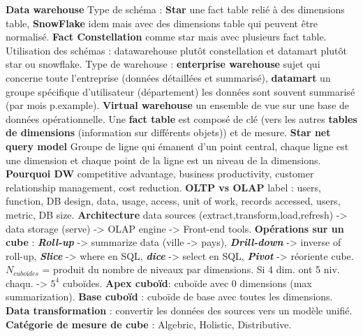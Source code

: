 \documentclass[9pt,a4paper]{report}
\begin{document}
\textbf{Data warehouse} Type de schéma : \textbf{Star} une fact table relié à des dimensions table, \textbf{SnowFlake} idem mais avec des dimensions table qui peuvent être normalisé. \textbf{ Fact Constellation} comme star mais avec plusieurs fact table. Utilisation des schémas : datawarehouse plutôt constellation et datamart plutôt star ou snowflake. Type de warehouse : \textbf{enterprise warehouse} sujet qui concerne toute l'entreprise (données détaillées et summarisé), \textbf{datamart} un groupe spécifique d'utilisateur (département) les données sont souvent summarisé (par mois p.example). \textbf{Virtual warehouse} un ensemble de vue sur une base de données opérationnelle. Une \textbf{fact table} est composé de clé (vers les autres \textbf{tables de dimensions} (information sur différents objets)) et de mesure. \textbf{Star net query model} Groupe de ligne qui émanent d'un point central, chaque ligne est une dimension et chaque point de la ligne est un niveau de la dimensions. \textbf{Pourquoi DW} competitive advantage, business productivity, customer relationship management, cost reduction. \textbf{OLTP vs OLAP} label : users, function, DB design, data, usage, access, unit of work, records accessed, users, metric, DB size. \textbf{Architecture} data sources (extract,transform,load,refresh) -> data storage (serve) -> OLAP engine -> Front-end tools. \textbf{Opérations sur un cube} : \textit{\textbf{Roll-up}} -> summarize data (ville -> pays), \textit{\textbf{Drill-down}} -> inverse of roll-up, \textit{\textbf{Slice}} -> where en SQL, \textit{\textbf{dice}} -> select en SQL, \textit{\textbf{Pivot}} -> réoriente cube. \textbf{$N_{cuboïdes}$} = produit du nombre de niveaux par dimensions. Si 4 dim. ont 5 niv. chaqu. -> $5^4$ cuboïdes. \textbf{Apex cuboïd}: cuboïde avec $0$ dimensions (max summarization). \textbf{Base cuboïd} : cuboïde de base avec toutes les dimensions. \textbf{Data transformation} : convertir les données des sources vers un modèle unifié. \textbf{Catégorie de mesure de cube} : Algebric, Holistic, Distributive.
\end{document}
